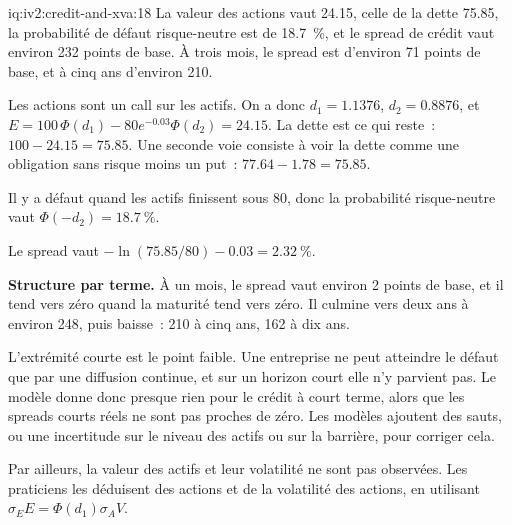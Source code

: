 \begin{solution}{iq:iv2:credit-and-xva:18}
La valeur des actions vaut 24.15, celle de la dette 75.85, la probabilité de défaut risque-neutre est de 18.7~\%, et le spread de crédit vaut environ 232 points de base. À trois mois, le spread est d'environ 71 points de base, et à cinq ans d'environ 210.

Les actions sont un call sur les actifs. On a donc $d_1 = 1.1376$, $d_2 = 0.8876$, et $E = 100\,\Phi(d_1) - 80 e^{-0.03}\Phi(d_2) = 24.15$. La dette est ce qui reste~: $100 - 24.15 = 75.85$. Une seconde voie consiste à voir la dette comme une obligation sans risque moins un put~: $77.64 - 1.78 = 75.85$.

Il y a défaut quand les actifs finissent sous 80, donc la probabilité risque-neutre vaut $\Phi(-d_2) = 18.7~\%$.

Le spread vaut $-\ln(75.85/80) - 0.03 = 2.32~\%$.

\textbf{Structure par terme.} À un mois, le spread vaut environ 2 points de base, et il tend vers zéro quand la maturité tend vers zéro. Il culmine vers deux ans à environ 248, puis baisse~: 210 à cinq ans, 162 à dix ans.

L'extrémité courte est le point faible. Une entreprise ne peut atteindre le défaut que par une diffusion continue, et sur un horizon court elle n'y parvient pas. Le modèle donne donc presque rien pour le crédit à court terme, alors que les spreads courts réels ne sont pas proches de zéro. Les modèles ajoutent des sauts, ou une incertitude sur le niveau des actifs ou sur la barrière, pour corriger cela.

Par ailleurs, la valeur des actifs et leur volatilité ne sont pas observées. Les praticiens les déduisent des actions et de la volatilité des actions, en utilisant $\sigma_E E = \Phi(d_1)\sigma_A V$.

\end{solution}

